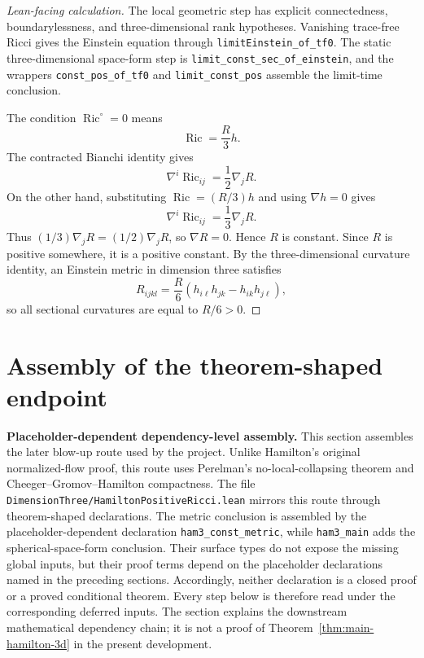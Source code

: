\documentclass[11pt]{article}
\theoremstyle{plain}
\theoremstyle{definition}
\theoremstyle{remark}
\newcommand{\Ric}{\operatorname{Ric}}
\newcommand{\leanref}[1]{\nolinkurl{#1}}
\newcommand{\leanfile}[1]{\nolinkurl{#1}}
\newcommand{\rffile}[1]{\leanfile{#1}}
\begin{document}
\begin{proof}[Lean-facing calculation]
The local geometric step has explicit connectedness, boundarylessness, and
three-dimensional rank hypotheses.  Vanishing trace-free
Ricci gives the Einstein equation through \leanref{limitEinstein_of_tf0}.  The
static three-dimensional space-form step is
\leanref{limit_const_sec_of_einstein}, and the wrappers
\leanref{const_pos_of_tf0} and \leanref{limit_const_pos} assemble the
limit-time conclusion.

The condition \(\Ric^\circ=0\) means
\[
\Ric=\frac R3h.
\]
The contracted Bianchi identity gives
\[
\nabla^i\Ric_{ij}=\frac12\nabla_jR.
\]
On the other hand, substituting \(\Ric=(R/3)h\) and using \(\nabla h=0\) gives
\[
\nabla^i\Ric_{ij}=\frac13\nabla_jR.
\]
Thus \((1/3)\nabla_jR=(1/2)\nabla_jR\), so \(\nabla R=0\).  Hence $R$ is
constant.  Since $R$ is positive somewhere, it is a positive constant.  By the
three-dimensional curvature identity, an Einstein metric in dimension three
satisfies
\[
R_{ijkl}
=
\frac R6
\left(h_{i\ell}h_{jk}-h_{ik}h_{j\ell}\right),
\]
so all sectional curvatures are equal to $R/6>0$.
\end{proof}

\section{Assembly of the theorem-shaped endpoint}
\label{sec:conditional-assembly}

\noindent\textbf{Placeholder-dependent dependency-level assembly.}
This section assembles the later blow-up route used by the project.  Unlike
Hamilton's original normalized-flow proof, this route uses Perelman's
no-local-collapsing theorem and Cheeger--Gromov--Hamilton compactness.  The file
\rffile{DimensionThree/HamiltonPositiveRicci.lean} mirrors this route
through theorem-shaped declarations.  The metric conclusion is assembled by
the placeholder-dependent declaration \leanref{ham3_const_metric}, while
\leanref{ham3_main} adds the spherical-space-form conclusion.  Their surface
types do not expose the missing global inputs, but their proof terms
depend on the placeholder declarations named in the preceding sections.
Accordingly, neither declaration is a closed proof or a proved
conditional theorem.
Every step below is therefore read under the corresponding deferred inputs.
The section explains the downstream mathematical dependency chain; it is not
a proof of Theorem~\ref{thm:main-hamilton-3d} in the present development.
\end{document}
